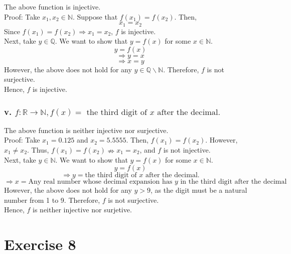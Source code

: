 \documentclass[
]{article}
\begin{document}
The above function is injective.\\
Proof: Take \(x_1, x_2 \in \mathbb{N}\). Suppose that
\(f(x_1) = f(x_2)\). Then, \[x_1= x_2\] Since
\(f(x_1) = f(x_2)\Longrightarrow x_1 = x_2\), \(f\) is injective.\\
Next, take \(y \in \mathbb{Q}\). We want to show that \(y = f(x)\) for
some \(x \in \mathbb{N}\).\\
\[y = f(x)\] \[\Longrightarrow y = x\] \[\Longrightarrow x = y\]
However, the above does not hold for any
\(y \in \mathbb{Q} \backslash \mathbb{N}\). Therefore, \(f\) is not
surjective.\\
Hence, \(f\) is injective.

\hypertarget{v.-fmathbbr-rightarrow-mathbbn-fx-text-the-third-digit-of-x-text-after-the-decimal.}{%
\subsubsection{\texorpdfstring{v.
\(f:\mathbb{R} \rightarrow \mathbb{N}, f(x) = \text{ the third digit of } x \text{ after the decimal.}\)}{v. f:\textbackslash mathbb\{R\} \textbackslash rightarrow \textbackslash mathbb\{N\}, f(x) = \textbackslash text\{ the third digit of \} x \textbackslash text\{ after the decimal.\}}}\label{v.-fmathbbr-rightarrow-mathbbn-fx-text-the-third-digit-of-x-text-after-the-decimal.}}

The above function is neither injective nor surjective.\\
Proof: Take \(x_1 = 0.125\) and \(x_2 = 5.5555\). Then,
\(f(x_1) = f(x_2)\). However, \(x_1 \neq x_2\). Thus,
\(f(x_1) = f(x_2) \nRightarrow x_1 = x_2\), and \(f\) is not
injective.\\
Next, take \(y \in \mathbb{N}\). We want to show that \(y = f(x)\) for
some \(x \in \mathbb{N}\).\\
\[y = f(x)\]
\[\Longrightarrow y = \text{the third digit of } x \text{ after the decimal.}\]
\[\Longrightarrow x = \text{Any real number whose decimal expansion has } y \text{ in the third digit after the decimal}\]
However, the above does not hold for any \(y > 9\), as the digit must be
a natural number from 1 to 9. Therefore, \(f\) is not surjective.\\
Hence, \(f\) is neither injective nor surjetive.

\hypertarget{exercise-8}{%
\section{Exercise 8}\label{exercise-8}}
\end{document}
